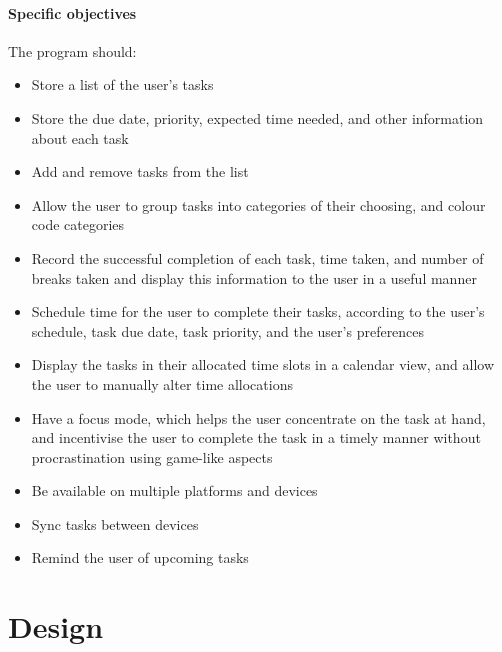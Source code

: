 \documentclass{article}
\begin{document}
\subsection{Specific objectives}
The program should:

\begin{itemize}
\item Store a list of the user's tasks
\item Store the due date, priority, expected time needed, and other information
  about each task
\item Add and remove tasks from the list
\item Allow the user to group tasks into categories of their choosing, and
  colour code categories
\item Record the successful completion of each task, time taken, and number of
  breaks taken and display this information to the user in a useful manner
\item Schedule time for the user to complete their tasks, according to the
  user's schedule, task due date, task priority, and the user's preferences
\item Display the tasks in their allocated time slots in a calendar view, and
  allow the user to manually alter time allocations
\item Have a focus mode, which helps the user concentrate on the task at hand,
  and incentivise the user to complete the task in a timely manner without
  procrastination using game-like aspects
\item Be available on multiple platforms and devices
\item Sync tasks between devices
\item Remind the user of upcoming tasks
\end{itemize}


\part{Design}
\end{document}
